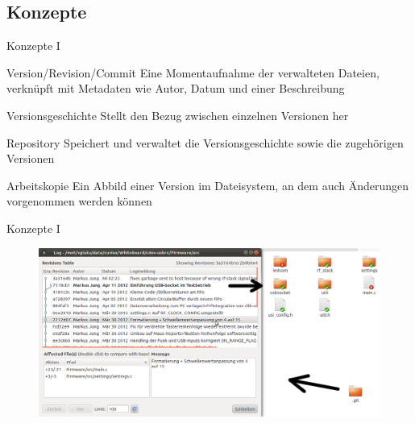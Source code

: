 \subsection{Konzepte}
\begin{frame}{Konzepte I}
	\begin{block}{Version/Revision/Commit}
		Eine Momentaufnahme der verwalteten Dateien, verknüpft mit Metadaten wie Autor, Datum und einer Beschreibung
	\end{block}
	\begin{block}{Versionsgeschichte}
		Stellt den Bezug zwischen einzelnen Versionen her
	\end{block}
	\begin{block}{Repository}
		Speichert und verwaltet die Versionsgeschichte sowie die zugehörigen Versionen
	\end{block}
	\begin{block}{Arbeitskopie}
		Ein Abbild einer Version im Dateisystem, an dem auch Änderungen vorgenommen werden können
	\end{block}
\end{frame}
\begin{frame}{Konzepte I}
	\begin{figure}
		\includegraphics[width=\linewidth]{images/history.png}
	\end{figure}
\end{frame}
